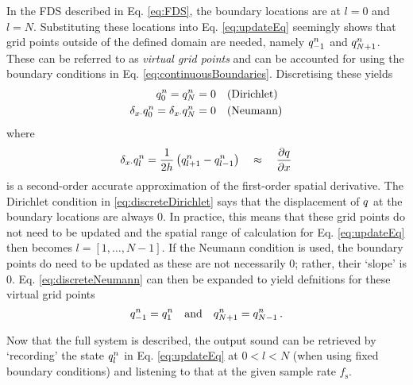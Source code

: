 In the FDS described in Eq. \eqref{eq:FDS}, the boundary locations are at $l = 0$ and $l = N$. Substituting these locations into Eq. \eqref{eq:updateEq} seemingly shows that grid points outside of the defined domain are needed, namely $q_{-1}^n$ and $q_{N+1}^n$. These can be referred to as \textit{virtual grid points} and can be accounted for using the boundary conditions in Eq. \eqref{eq:continuousBoundaries}. Discretising these yields
\begin{subequations}
    \begin{align}
        q_0^n = q_N^n &= 0 \quad\text{(Dirichlet)}\label{eq:discreteDirichlet}\\
        \delta_{x\cdot} q_0^n = \delta_{x\cdot} q_N^n &= 0 \quad \text{(Neumann)}\label{eq:discreteNeumann}
    \end{align}
\end{subequations}
where 
\begin{equation}
    \delta_{x\cdot}q_l^n = \frac{1}{2h}\left(q_{l+1}^n - q_{l-1}^n\right)\quad \approx\quad \frac{\partial q}{\partial x}
\end{equation}
is a second-order accurate approximation of the first-order spatial derivative. The Dirichlet condition in \eqref{eq:discreteDirichlet} says that the displacement of $q$ at the boundary locations are always 0. In practice, this means that these grid points do not need to be updated and the spatial range of calculation for Eq. \eqref{eq:updateEq} then becomes $l = [1, \hdots, N-1]$. If the Neumann condition is used, the boundary points do need to be updated as these are not necessarily $0$; rather, their `slope' is $0$. Eq. \eqref{eq:discreteNeumann} can then be expanded to yield defnitions for these virtual grid points
\begin{equation}\label{eq:neumannSolution}
    q_{-1}^n = q_1^n \quad \text{and} \quad q_{N+1}^n = q_{N-1}^n\,.
\end{equation}

Now that the full system is described, the output sound can be retrieved by `recording' the state $q_l^n$ in Eq. \eqref{eq:updateEq} at $0 < l < N$ (when using fixed boundary conditions) and listening to that at the given sample rate $f_\text{s}$. %

